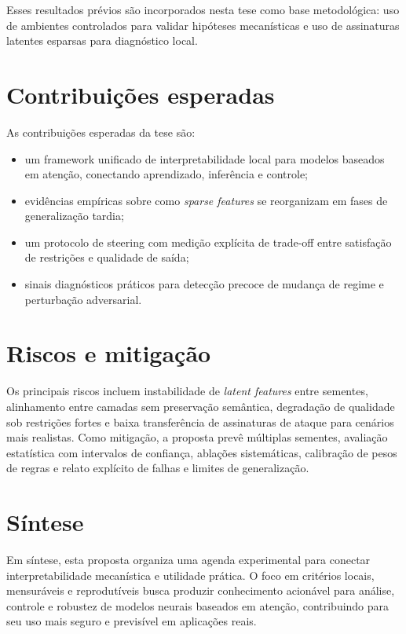 Esses resultados prévios são incorporados nesta tese como base metodológica: uso de ambientes controlados para validar hipóteses mecanísticas e uso de assinaturas latentes esparsas para diagnóstico local.

\section*{Contribuições esperadas}
As contribuições esperadas da tese são:
\begin{itemize}
    \item um framework unificado de interpretabilidade local para modelos baseados em atenção, conectando aprendizado, inferência e controle;
    \item evidências empíricas sobre como \textit{sparse features} se reorganizam em fases de generalização tardia;
    \item um protocolo de steering com medição explícita de trade-off entre satisfação de restrições e qualidade de saída;
    \item sinais diagnósticos práticos para detecção precoce de mudança de regime e perturbação adversarial.
\end{itemize}

\section*{Riscos e mitigação}
Os principais riscos incluem instabilidade de \textit{latent features} entre sementes, alinhamento entre camadas sem preservação semântica, degradação de qualidade sob restrições fortes e baixa transferência de assinaturas de ataque para cenários mais realistas. Como mitigação, a proposta prevê múltiplas sementes, avaliação estatística com intervalos de confiança, ablações sistemáticas, calibração de pesos de regras e relato explícito de falhas e limites de generalização.

\section*{Síntese}
Em síntese, esta proposta organiza uma agenda experimental para conectar interpretabilidade mecanística e utilidade prática. O foco em critérios locais, mensuráveis e reprodutíveis busca produzir conhecimento acionável para análise, controle e robustez de modelos neurais baseados em atenção, contribuindo para seu uso mais seguro e previsível em aplicações reais.
